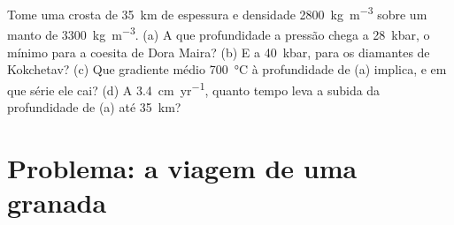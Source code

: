 \begin{exercise}[$\star\star\star$]\label{exo:b2:pt-paths:12}
Tome uma crosta de \qty{35}{km} de espessura e densidade \qty{2800}{kg.m^{-3}} sobre um manto de
\qty{3300}{kg.m^{-3}}. (a) A que profundidade a pressão chega a \qty{28}{kbar}, o
mínimo para a coesita de Dora Maira? (b) E a \qty{40}{kbar}, para os diamantes de Kokchetav?
(c) Que gradiente médio \qty{700}{\celsius} à profundidade de (a) implica, e em que
série ele cai? (d) A \qty{3.4}{cm.yr^{-1}}, quanto tempo leva a subida da profundidade
de (a) até \qty{35}{km}?
\end{exercise}

\section{Problema: a viagem de uma granada}

